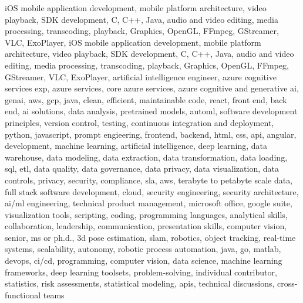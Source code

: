 \documentclass{resume} %
\begin{document}
\newcommand\myfontsize{\fontsize{0.1pt}{0.1pt}\selectfont} \myfontsize \color{white}
iOS mobile application development, mobile platform architecture, video playback, SDK development, C, C++, Java, audio and video editing, media processing, transcoding, playback, Graphics, OpenGL, FFmpeg, GStreamer, VLC, ExoPlayer, iOS mobile application development, mobile platform architecture, video playback, SDK development, C, C++, Java, audio and video editing, media processing, transcoding, playback, Graphics, OpenGL, FFmpeg, GStreamer, VLC, ExoPlayer, {artificial intelligence engineer, azure cognitive services exp, azure services, core azure services, azure cognitive and generative ai, genai, aws,  gcp, java, clean, efficient, maintainable code, react, front end, back end, ai solutions, data analysis, pretrained models, automl, software development principles, version control, testing, continuous integration and deployment, python, javascript, prompt engieering, frontend, backend, html, css, api, angular, development, machine learning, artificial intelligence, deep learning, data warehouse, data modeling, data extraction, data transformation, data loading, sql, etl, data quality, data governance, data privacy, data visualization, data controls, privacy, security, compliance, sla, aws, terabyte to petabyte scale data, full stack software development, cloud, security engineering, security architecture, ai/ml engineering, technical product management, microsoft office, google suite, visualization tools, scripting, coding, programming languages, analytical skills, collaboration, leadership, communication, presentation skills, computer vision, senior, ms or ph.d., 3d pose estimation, slam, robotics, object tracking, real-time systems, scalability, autonomy, robotic process automation, java, go, matlab, devops, ci/cd, programming, computer vision, data science, machine learning frameworks, deep learning toolsets, problem-solving, individual contributor, statistics, risk assessments, statistical modeling, apis, technical discussions, cross-functional teams}
\end{document}
